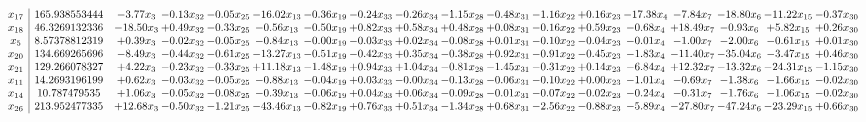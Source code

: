 \documentclass[9pt]{article}
\begin{document}
 \[\begin{array}{c| c c@{\hskip 2pt} c@{\hskip 2pt} c@{\hskip 2pt} c@{\hskip 2pt} c@{\hskip 2pt} c@{\hskip 2pt} c@{\hskip 2pt} c@{\hskip 2pt} c@{\hskip 2pt} c@{\hskip 2pt} c@{\hskip 2pt} c@{\hskip 2pt} c@{\hskip 2pt} c@{\hskip 2pt} c@{\hskip 2pt} c@{\hskip 2pt} }
 x_{17}   &  165.938553444 & -3.77 x_{3} & -0.13 x_{32} & -0.05 x_{25} & -16.02 x_{13} & -0.36 x_{19} & -0.24 x_{33} & -0.26 x_{34} & -1.15 x_{28} & -0.48 x_{31} & -1.16 x_{22} & +  0.16 x_{23} & -17.38 x_{4} & -7.84 x_{7} & -18.80 x_{6} & -11.22 x_{15} & -0.37 x_{30}\\
 x_{18}   &  46.3269132336 & -18.50 x_{3} & +  0.49 x_{32} & -0.33 x_{25} & -0.56 x_{13} & -0.50 x_{19} & +  0.82 x_{33} & +  0.58 x_{34} & +  0.48 x_{28} & +  0.08 x_{31} & -0.16 x_{22} & +  0.59 x_{23} & -0.68 x_{4} & + 18.49 x_{7} & -0.93 x_{6} & +  5.82 x_{15} & +  0.26 x_{30}\\
 x_{5}   &  8.57378812319 & +  0.39 x_{3} & -0.02 x_{32} & -0.05 x_{25} & -0.84 x_{13} & -0.00 x_{19} & -0.03 x_{33} & +  0.02 x_{34} & -0.08 x_{28} & +  0.01 x_{31} & -0.10 x_{22} & -0.04 x_{23} & -0.01 x_{4} & -1.00 x_{7} & -2.00 x_{6} & -0.61 x_{15} & +  0.01 x_{30}\\
 x_{20}   &  134.669265696 & -8.49 x_{3} & -0.44 x_{32} & -0.61 x_{25} & -13.27 x_{13} & -0.51 x_{19} & -0.42 x_{33} & +  0.35 x_{34} & -0.38 x_{28} & +  0.92 x_{31} & -0.91 x_{22} & -0.45 x_{23} & -1.83 x_{4} & -11.40 x_{7} & -35.04 x_{6} & -3.47 x_{15} & +  0.46 x_{30}\\
 x_{21}   &  129.266078327 & +  4.22 x_{3} & -0.23 x_{32} & -0.33 x_{25} & + 11.18 x_{13} & -1.48 x_{19} & +  0.94 x_{33} & +  1.04 x_{34} & -0.81 x_{28} & -1.45 x_{31} & -0.31 x_{22} & +  0.14 x_{23} & -6.84 x_{4} & + 12.32 x_{7} & -13.32 x_{6} & -24.31 x_{15} & -1.15 x_{30}\\
 x_{11}   &  14.2693196199 & +  0.62 x_{3} & -0.03 x_{32} & -0.05 x_{25} & -0.88 x_{13} & -0.04 x_{19} & +  0.03 x_{33} & -0.00 x_{34} & -0.13 x_{28} & -0.06 x_{31} & -0.10 x_{22} & +  0.00 x_{23} & -1.01 x_{4} & -0.69 x_{7} & -1.38 x_{6} & -1.66 x_{15} & -0.02 x_{30}\\
 x_{14}   &  10.787479535 & +  1.06 x_{3} & -0.05 x_{32} & -0.08 x_{25} & -0.39 x_{13} & -0.06 x_{19} & +  0.04 x_{33} & +  0.06 x_{34} & -0.09 x_{28} & -0.01 x_{31} & -0.07 x_{22} & -0.02 x_{23} & -0.24 x_{4} & -0.31 x_{7} & -1.76 x_{6} & -1.06 x_{15} & -0.02 x_{30}\\
 x_{26}   &  213.952477335 & + 12.68 x_{3} & -0.50 x_{32} & -1.21 x_{25} & -43.46 x_{13} & -0.82 x_{19} & +  0.76 x_{33} & +  0.51 x_{34} & -1.34 x_{28} & +  0.68 x_{31} & -2.56 x_{22} & -0.88 x_{23} & -5.89 x_{4} & -27.80 x_{7} & -47.24 x_{6} & -23.29 x_{15} & +  0.66 x_{30}\\

\end{array}\]
\end{document}
